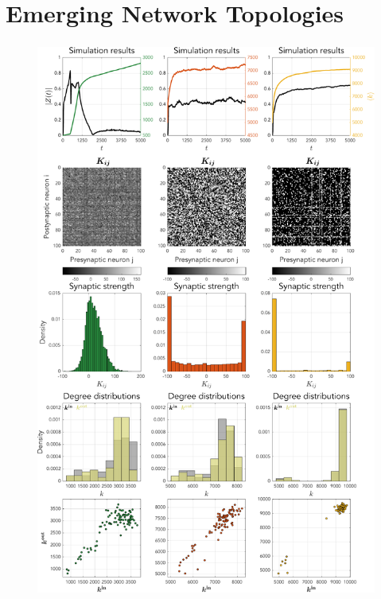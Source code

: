 \section{\mywork Emerging Network Topologies} 
\begin{frame}
\frametitle{\STDP}
\begin{figure}[H]
\centering
\includegraphics[trim=0cm 24.7cm 0cm 8.4cm, clip=true, height = 0.455\textheight]{../Figures/Learning/STDP.pdf}
\label{fig:STDP}
\end{figure}
\begin{figure}[H]
\centering

\end{figure}
\end{frame}
